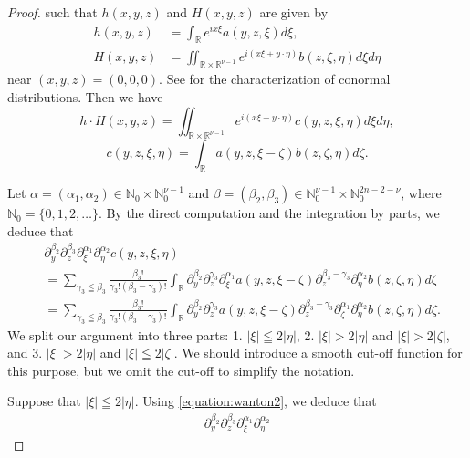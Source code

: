 \documentclass[a4paper,11pt,reqno]{amsart}
\numberwithin{equation}{section}
\theoremstyle{definition}
\theoremstyle{remark}
\begin{document}
\begin{proof}
%
%
such that $h(x,y,z)$ and $H(x,y,z)$ are given by 
%
%
\begin{align*}
   h(x,y,z)
& = 
  \int_{\mathbb{R}}
  e^{ix\xi}
  a(y,z,\xi)
  d\xi,
\\
  H(x,y,z)
& =
  \iint_{\mathbb{R}\times\mathbb{R}^{\nu-1}}
  e^{i(x\xi+y\cdot\eta)}
  b(z,\xi,\eta)
  d\xi
  d\eta
\end{align*}
%
% 
near $(x,y,z)=(0,0,0)$. 
See \cite[Section~18.2]{Hoermander3} for the characterization of conormal distributions. 
Then we have 
%
%
$$
h{\cdot}H(x,y,z)
=
\iint_{\mathbb{R}\times\mathbb{R}^{\nu-1}}
e^{i(x\xi+y\cdot\eta)}
c(y,z,\xi,\eta)
d\xi
d\eta, 
$$
%
%
$$
c(y,z,\xi,\eta)
=
\int_{\mathbb{R}}
a(y,z,\xi-\zeta)b(z,\zeta,\eta)
d\zeta. 
$$
%
%
\par
%
%
Let $\alpha=(\alpha_1,\alpha_2) \in \mathbb{N}_0\times\mathbb{N}_0^{\nu-1}$ and 
$\beta=(\beta_2,\beta_3) \in \mathbb{N}_0^{\nu-1}\times\mathbb{N}_0^{2n-2-\nu}$, 
where $\mathbb{N}_0=\{0,1,2,\dotsc\}$. 
By the direct computation and the integration by parts, we deduce that 
%
%
\begin{align}
&  \partial_y^{\beta_2}\partial_z^{\beta_3}\partial_\xi^{\alpha_1}\partial_\eta^{\alpha_2}
  c(y,z,\xi,\eta)
\nonumber
\\
& =
  \sum_{\gamma_3\leqq\beta_3}
  \frac{\beta_3!}{\gamma_3!(\beta_3-\gamma_3)!}
  \int_\mathbb{R}
  \partial_y^{\beta_2}\partial_z^{\gamma_3}\partial_\xi^{\alpha_1}a(y,z,\xi-\zeta)
  \partial_z^{\beta_3-\gamma_3}\partial_\eta^{\alpha_2}b(z,\zeta,\eta)
  d\zeta
\label{equation:wanton1}
\\
& =
  \sum_{\gamma_3\leqq\beta_3}
  \frac{\beta_3!}{\gamma_3!(\beta_3-\gamma_3)!}
  \int_\mathbb{R}
  \partial_y^{\beta_2}\partial_z^{\gamma_3}a(y,z,\xi-\zeta)
  \partial_z^{\beta_3-\gamma_3}\partial_\zeta^{\alpha_1}\partial_\eta^{\alpha_2}b(z,\zeta,\eta)
  d\zeta.
\label{equation:wanton2}
\end{align}
%
%
We split our argument into three parts: 
1. $\lvert\xi\rvert\leqq2\lvert\eta\rvert$, 
2. $\lvert\xi\rvert>2\lvert\eta\rvert$ and $\lvert\xi\rvert>2\lvert\zeta\rvert$, 
and 3. $\lvert\xi\rvert>2\lvert\eta\rvert$ and $\lvert\xi\rvert\leqq2\lvert\zeta\rvert$.  
We should introduce a smooth cut-off function for this purpose, 
but we omit the cut-off to simplify the notation.    
%
%
\par
%
%
Suppose that $\lvert\xi\rvert\leqq2\lvert\eta\rvert$. 
Using \eqref{equation:wanton2}, we deduce that 
%
%
\begin{align*}
  \partial_y^{\beta_2}\partial_z^{\beta_3}\partial_\xi^{\alpha_1}\partial_\eta^{\alpha_2}

\end{align*}
\end{proof}
\end{document}
